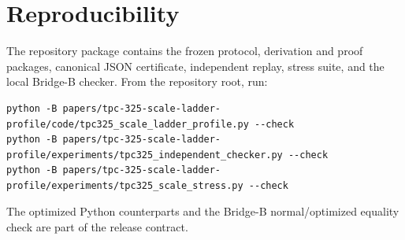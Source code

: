 \documentclass[10pt]{article}
\begin{document}
\section{Reproducibility}

The repository package contains the frozen protocol, derivation and proof
packages, canonical JSON certificate, independent replay, stress suite, and
the local Bridge-B checker.  From the repository root, run:
\begin{verbatim}
python -B papers/tpc-325-scale-ladder-profile/code/tpc325_scale_ladder_profile.py --check
python -B papers/tpc-325-scale-ladder-profile/experiments/tpc325_independent_checker.py --check
python -B papers/tpc-325-scale-ladder-profile/experiments/tpc325_scale_stress.py --check
\end{verbatim}
The optimized Python counterparts and the Bridge-B normal/optimized equality
check are part of the release contract.



\end{document}
